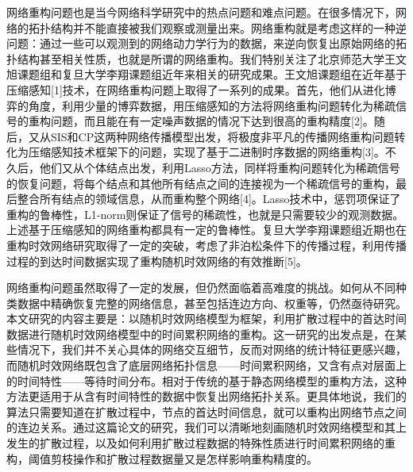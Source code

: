 \documentclass[journal]{IEEEtran}
\begin{document}
	网络重构问题也是当今网络科学研究中的热点问题和难点问题。在很多情况下，网络的拓扑结构并不能直接被我们观察或测量出来。网络重构就是考虑这样的一种逆问题：通过一些可以观测到的网络动力学行为的数据，来逆向恢复出原始网络的拓扑结构甚至相关性质，也就是所谓的网络重构。我们特别关注了北京师范大学王文旭课题组和复旦大学李翔课题组近年来相关的研究成果。王文旭课题组在近年基于压缩感知[1]技术，在网络重构问题上取得了一系列的成果。首先，他们从进化博弈的角度，利用少量的博弈数据，用压缩感知的方法将网络重构问题转化为稀疏信号的重构问题，而且能在有一定噪声数据的情况下达到很高的重构精度[2]。随后，又从SIS和CP这两种网络传播模型出发，将极度非平凡的传播网络重构问题转化为压缩感知技术框架下的问题，实现了基于二进制时序数据的网络重构[3]。不久后，他们又从个体结点出发，利用Lasso方法，同样将重构问题转化为稀疏信号的恢复问题，将每个结点和其他所有结点之间的连接视为一个稀疏信号的重构，最后整合所有结点的领域信息，从而重构整个网络[4]。Lasso技术中，惩罚项保证了重构的鲁棒性，L1-norm则保证了信号的稀疏性，也就是只需要较少的观测数据。上述基于压缩感知的网络重构都具有一定的鲁棒性。复旦大学李翔课题组近期也在重构时效网络研究取得了一定的突破，考虑了非泊松条件下的传播过程，利用传播过程的到达时间数据实现了重构随机时效网络的有效推断[5]。
	
	网络重构问题虽然取得了一定的发展，但仍然面临着高难度的挑战。如何从不同种类数据中精确恢复完整的网络信息，甚至包括连边方向、权重等，仍然亟待研究。本文研究的内容主要是：以随机时效网络模型为框架，利用扩散过程中的首达时间数据进行随机时效网络模型中的时间累积网络的重构。这一研究的出发点是，在某些情况下，我们并不关心具体的网络交互细节，反而对网络的统计特征更感兴趣，而随机时效网络既包含了底层网络拓扑信息——时间累积网络，又含有点对层面上的时间特性——等待时间分布。相对于传统的基于静态网络模型的重构方法，这种方法更适用于从含有时间特性的数据中恢复出网络拓扑关系。更具体地说，我们的算法只需要知道在扩散过程中，节点的首达时间信息，就可以重构出网络节点之间的连边关系。通过这篇论文的研究，我们可以清晰地刻画随机时效网络模型和其上发生的扩散过程，以及如何利用扩散过程数据的特殊性质进行时间累积网络的重构，阈值剪枝操作和扩散过程数据量又是怎样影响重构精度的。
	


	
	
\end{document}

